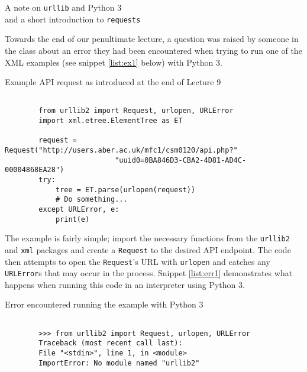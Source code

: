 \documentclass[a4paper]{article}
\begin{document}
\begin{center}
    {\huge{A note on \texttt{urllib} and Python 3}}\\
    {\LARGE{and a short introduction to \texttt{requests}}}
\noindent\makebox[\linewidth]{\rule{\paperwidth}{0.4pt}}
\end{center}

\vskip 0.5cm

Towards the end of our penultimate lecture, a question was raised by someone in
the class about an error they had been encountered when trying to run one of the
XML examples (see snippet \ref{list:ex1} below) with Python 3.

\begin{listing}[H]
    \caption[]{Example API request as introduced at the end of Lecture 9}
    \label{list:ex1}
    \begin{verbatim}

        from urllib2 import Request, urlopen, URLError
        import xml.etree.ElementTree as ET

        request = Request("http://users.aber.ac.uk/mfc1/csm0120/api.php?"
                          "uuid0=0BA846D3-CBA2-4D81-AD4C-00004868EA28")
        try:
            tree = ET.parse(urlopen(request))
            # Do something...
        except URLError, e:
            print(e)

    \end{verbatim}
\end{listing}

The example is fairly simple; import the necessary functions from the \texttt{urllib2}
and \texttt{xml} packages and create a \texttt{Request} to the desired API endpoint. The code
then attempts to open the \texttt{Request}'s URL with \texttt{urlopen} and
catches any \texttt{URLError}s that may occur in the process. Snippet \ref{list:err1}
demonstrates what happens when running this code in an interpreter using Python 3.

\begin{listing}[H]
    \caption[]{Error encountered running the example with Python 3}
    \label{list:err1}
    \begin{verbatim}

        >>> from urllib2 import Request, urlopen, URLError
        Traceback (most recent call last):
        File "<stdin>", line 1, in <module>
        ImportError: No module named "urllib2"

    \end{verbatim}
\end{listing}
\end{document}
